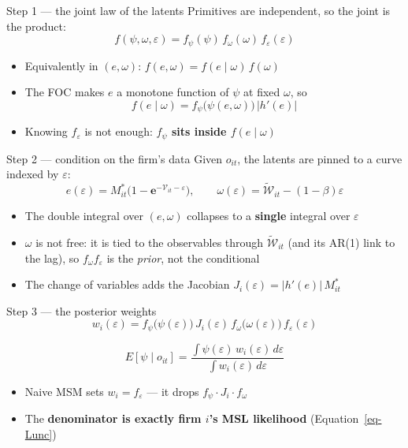 \documentclass[
  ignorenonframetext,
  aspectratio=169,
]{beamer}
\providecommand{\tightlist}{%
  \setlength{\itemsep}{0pt}\setlength{\parskip}{0pt}}
\begin{document}
\begin{frame}{Step 1 --- the joint law of the latents}
\protect{}\label{step-1-the-joint-law-of-the-latents}
Primitives are independent, so the joint is the product: \[
f(\psi,\omega,\varepsilon)=f_\psi(\psi)\,f_\omega(\omega)\,f_\varepsilon(\varepsilon)
\]

\begin{itemize}
\tightlist
\item
  Equivalently in \((e,\omega)\):
  \(f(e,\omega)=f(e\mid\omega)\,f(\omega)\)
\item
  The FOC makes \(e\) a monotone function of \(\psi\) at fixed
  \(\omega\), so \[
  f(e\mid\omega)=f_\psi\big(\psi(e,\omega)\big)\,\big|h'(e)\big|
  \]
\item
  Knowing \(f_\varepsilon\) is not enough: \textbf{\(f_\psi\) sits
  inside \(f(e\mid\omega)\)}
\end{itemize}
\end{frame}

\begin{frame}{Step 2 --- condition on the firm's data}
\protect{}\label{step-2-condition-on-the-firms-data}
Given \(o_{it}\), the latents are pinned to a curve indexed by
\(\varepsilon\): \[
e(\varepsilon)=M^*_{it}\big(1-\textbf{e}^{-\mathcal V_{it}-\varepsilon}\big),\qquad
\omega(\varepsilon)=\tilde{\mathcal W}_{it}-(1-\beta)\varepsilon
\]

\begin{itemize}
\tightlist
\item
  The double integral over \((e,\omega)\) collapses to a \textbf{single}
  integral over \(\varepsilon\)
\item
  \(\omega\) is not free: it is tied to the observables through
  \(\tilde{\mathcal W}_{it}\) (and its AR(1) link to the lag), so
  \(f_\omega f_\varepsilon\) is the \emph{prior}, not the conditional
\item
  The change of variables adds the Jacobian
  \(J_i(\varepsilon)=|h'(e)|\,M^*_{it}\)
\end{itemize}
\end{frame}

\begin{frame}{Step 3 --- the posterior weights}
\protect{}\label{step-3-the-posterior-weights}
\[
w_i(\varepsilon)=f_\psi\big(\psi(\varepsilon)\big)\,J_i(\varepsilon)\,f_\omega\big(\omega(\varepsilon)\big)\,f_\varepsilon(\varepsilon)
\]

\[
E[\psi\mid o_{it}]=\frac{\int\psi(\varepsilon)\,w_i(\varepsilon)\,d\varepsilon}{\int w_i(\varepsilon)\,d\varepsilon}
\]

\begin{itemize}
\tightlist
\item
  Naive MSM sets \(w_i=f_\varepsilon\) --- it drops
  \(f_\psi\cdot J_i\cdot f_\omega\)
\item
  The \textbf{denominator is exactly firm \(i\)'s MSL likelihood}
  (Equation~\ref{eq-Lunc})
\end{itemize}
\end{frame}
\end{document}
